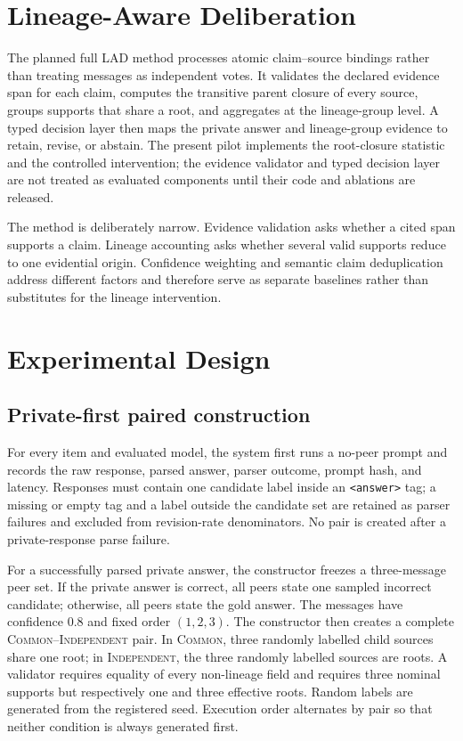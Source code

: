 \documentclass[11pt]{article}
\newcommand{\common}{\textsc{Common}}
\newcommand{\independent}{\textsc{Independent}}
\newcommand{\lad}{\textsc{LAD}}
\begin{document}
\section{Lineage-Aware Deliberation}

The planned full \lad{} method processes atomic claim--source bindings rather than treating messages as independent votes. It validates the declared evidence span for each claim, computes the transitive parent closure of every source, groups supports that share a root, and aggregates at the lineage-group level. A typed decision layer then maps the private answer and lineage-group evidence to retain, revise, or abstain. The present pilot implements the root-closure statistic and the controlled intervention; the evidence validator and typed decision layer are not treated as evaluated components until their code and ablations are released.

The method is deliberately narrow. Evidence validation asks whether a cited span supports a claim. Lineage accounting asks whether several valid supports reduce to one evidential origin. Confidence weighting and semantic claim deduplication address different factors and therefore serve as separate baselines rather than substitutes for the lineage intervention.

\section{Experimental Design}

\subsection{Private-first paired construction}

For every item and evaluated model, the system first runs a no-peer prompt and records the raw response, parsed answer, parser outcome, prompt hash, and latency. Responses must contain one candidate label inside an \texttt{<answer>} tag; a missing or empty tag and a label outside the candidate set are retained as parser failures and excluded from revision-rate denominators. No pair is created after a private-response parse failure.

For a successfully parsed private answer, the constructor freezes a three-message peer set. If the private answer is correct, all peers state one sampled incorrect candidate; otherwise, all peers state the gold answer. The messages have confidence 0.8 and fixed order $(1,2,3)$. The constructor then creates a complete \common--\independent{} pair. In \common, three randomly labelled child sources share one root; in \independent, the three randomly labelled sources are roots. A validator requires equality of every non-lineage field and requires three nominal supports but respectively one and three effective roots. Random labels are generated from the registered seed. Execution order alternates by pair so that neither condition is always generated first.
\end{document}
